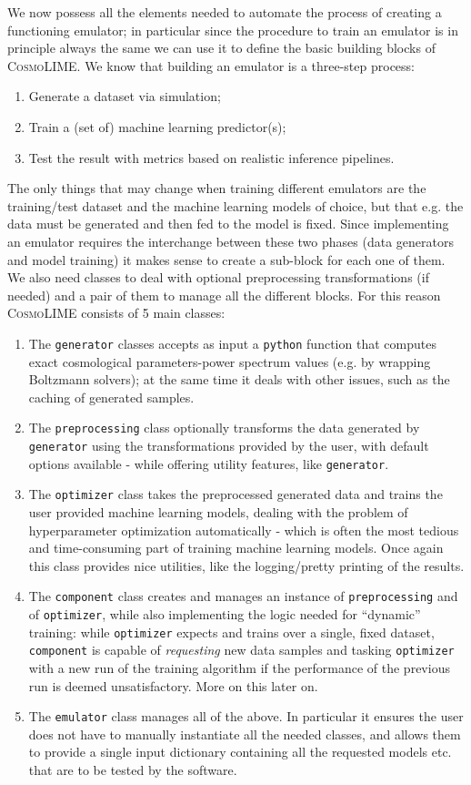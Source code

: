We now possess all the elements needed to automate the process of creating a functioning emulator; in particular since the procedure to train an emulator is in principle always the same we can use it to define the basic building blocks of \textsc{CosmoLIME}. 
We know that building an emulator is a three-step process:
\begin{enumerate}
    \item Generate a dataset via simulation;
    \item Train a (set of) machine learning predictor(s);
    \item Test the result with metrics based on realistic inference pipelines.
\end{enumerate} %
The only things that may change when training different emulators are the training/test dataset and the machine learning models of choice, but that e.g. the data must be generated and then fed to the model is fixed. Since implementing an emulator requires the interchange between these two phases (data generators and model training) it makes sense to create a sub-block for each one of them. We also need classes to deal with optional preprocessing transformations (if needed) and a pair of them to manage all the different blocks. For this reason \textsc{CosmoLIME} consists of 5 main classes:
\begin{enumerate}
    \item The \texttt{generator} classes accepts as input a \texttt{python} function that computes exact cosmological parameters-power spectrum values (e.g. by wrapping Boltzmann solvers); at the same time it deals with other issues, such as the caching of generated samples.
    \item The \texttt{preprocessing} class optionally transforms the data generated by \texttt{generator} using the transformations provided by the user, with default options available - while offering utility features, like \texttt{generator}.
    \item The \texttt{optimizer} class takes the preprocessed generated data and trains the user provided machine learning models, dealing with the problem of hyperparameter optimization automatically - which is often the most tedious and time-consuming part of training machine learning models. Once again this class provides nice utilities, like the logging/pretty printing of the results.
    \item The \texttt{component} class creates and manages an instance of \texttt{preprocessing} and of \texttt{optimizer}, while also implementing the logic needed for ``dynamic'' training: while \texttt{optimizer} expects and trains over a single, fixed dataset, \texttt{component} is capable of \emph{requesting} new data samples and tasking \texttt{optimizer} with a new run of the training algorithm if the performance of the previous run is deemed unsatisfactory. More on this later on.
    \item The \texttt{emulator} class manages all of the above. In particular it ensures the user does not have to manually instantiate all the needed classes, and allows them to provide a single input dictionary containing all the requested models etc. that are to be tested by the software.
\end{enumerate}

